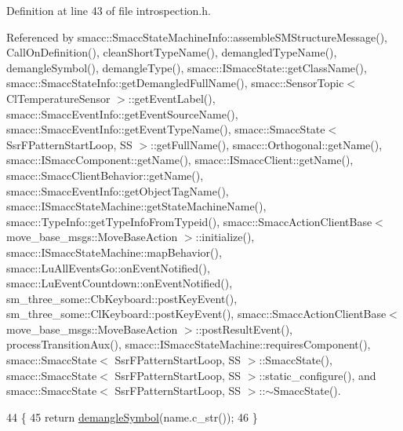 Definition at line 43 of file introspection.\+h.



Referenced by smacc\+::\+Smacc\+State\+Machine\+Info\+::assemble\+S\+M\+Structure\+Message(), Call\+On\+Definition(), clean\+Short\+Type\+Name(), demangled\+Type\+Name(), demangle\+Symbol(), demangle\+Type(), smacc\+::\+I\+Smacc\+State\+::get\+Class\+Name(), smacc\+::\+Smacc\+State\+Info\+::get\+Demangled\+Full\+Name(), smacc\+::\+Sensor\+Topic$<$ Cl\+Temperature\+Sensor $>$\+::get\+Event\+Label(), smacc\+::\+Smacc\+Event\+Info\+::get\+Event\+Source\+Name(), smacc\+::\+Smacc\+Event\+Info\+::get\+Event\+Type\+Name(), smacc\+::\+Smacc\+State$<$ Ssr\+F\+Pattern\+Start\+Loop, S\+S $>$\+::get\+Full\+Name(), smacc\+::\+Orthogonal\+::get\+Name(), smacc\+::\+I\+Smacc\+Component\+::get\+Name(), smacc\+::\+I\+Smacc\+Client\+::get\+Name(), smacc\+::\+Smacc\+Client\+Behavior\+::get\+Name(), smacc\+::\+Smacc\+Event\+Info\+::get\+Object\+Tag\+Name(), smacc\+::\+I\+Smacc\+State\+Machine\+::get\+State\+Machine\+Name(), smacc\+::\+Type\+Info\+::get\+Type\+Info\+From\+Typeid(), smacc\+::\+Smacc\+Action\+Client\+Base$<$ move\+\_\+base\+\_\+msgs\+::\+Move\+Base\+Action $>$\+::initialize(), smacc\+::\+I\+Smacc\+State\+Machine\+::map\+Behavior(), smacc\+::\+Lu\+All\+Events\+Go\+::on\+Event\+Notified(), smacc\+::\+Lu\+Event\+Countdown\+::on\+Event\+Notified(), sm\+\_\+three\+\_\+some\+::\+Cb\+Keyboard\+::post\+Key\+Event(), sm\+\_\+three\+\_\+some\+::\+Cl\+Keyboard\+::post\+Key\+Event(), smacc\+::\+Smacc\+Action\+Client\+Base$<$ move\+\_\+base\+\_\+msgs\+::\+Move\+Base\+Action $>$\+::post\+Result\+Event(), process\+Transition\+Aux(), smacc\+::\+I\+Smacc\+State\+Machine\+::requires\+Component(), smacc\+::\+Smacc\+State$<$ Ssr\+F\+Pattern\+Start\+Loop, S\+S $>$\+::\+Smacc\+State(), smacc\+::\+Smacc\+State$<$ Ssr\+F\+Pattern\+Start\+Loop, S\+S $>$\+::static\+\_\+configure(), and smacc\+::\+Smacc\+State$<$ Ssr\+F\+Pattern\+Start\+Loop, S\+S $>$\+::$\sim$\+Smacc\+State().


\begin{DoxyCode}
44 \{
45     \textcolor{keywordflow}{return} \hyperlink{namespacesmacc_a4dd421d5d4e7617fcf4a9a756797adda}{demangleSymbol}(name.c\_str());
46 \}
\end{DoxyCode}


